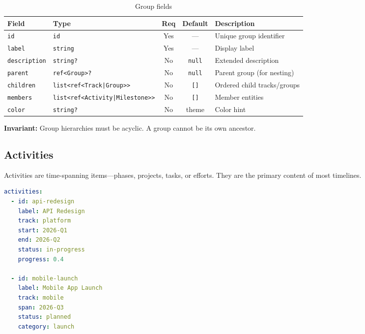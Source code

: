\begin{table}[h]
\centering
\small
\begin{tabular}{llccp{4.5cm}}
\toprule
\textbf{Field} & \textbf{Type} & \textbf{Req} & \textbf{Default} & \textbf{Description} \\
\midrule
\texttt{id} & \texttt{id} & Yes & --- & Unique group identifier \\
\texttt{label} & \texttt{string} & Yes & --- & Display label \\
\texttt{description} & \texttt{string?} & No & \texttt{null} & Extended description \\
\texttt{parent} & \texttt{ref<Group>?} & No & \texttt{null} & Parent group (for nesting) \\
\texttt{children} & \texttt{list<ref<Track|Group>>} & No & \texttt{[]} & Ordered child tracks/groups \\
\texttt{members} & \texttt{list<ref<Activity|Milestone>>} & No & \texttt{[]} & Member entities \\
\texttt{color} & \texttt{string?} & No & theme & Color hint \\
\bottomrule
\end{tabular}
\caption{Group fields}
\label{tab:group-fields}
\end{table}

\textbf{Invariant:} Group hierarchies must be acyclic. A group cannot be its own ancestor.


\subsection{Activities}
\label{sec:ir-activities}

Activities are time-spanning items---phases, projects, tasks, or efforts. They are the
primary content of most timelines.

\begin{lstlisting}[language=yaml,caption={Activity examples}]
activities:
  - id: api-redesign
    label: API Redesign
    track: platform
    start: 2026-Q1
    end: 2026-Q2
    status: in-progress
    progress: 0.4

  - id: mobile-launch
    label: Mobile App Launch
    track: mobile
    span: 2026-Q3
    status: planned
    category: launch
\end{lstlisting}

